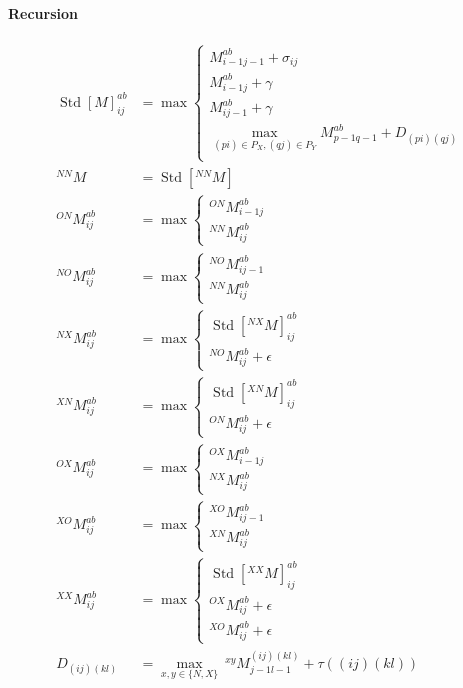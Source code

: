 \documentclass{article}
\newcommand{\N}[1]{\operatorname{Std}[#1]}
\begin{document}
\paragraph{Recursion}
\begin{align*}
  \N{M}^{ab}_{ij} &= 
  \max
  \begin{cases}
    M^{ab}_{i-1j-1} + \sigma_{ij}\\
    M^{ab}_{i-1j} + \gamma\\
    M^{ab}_{ij-1} + \gamma\\
    \max_{(pi)\in P_X,(qj)\in P_Y} M^{ab}_{p-1q-1} + D_{(pi)(qj)}\\
  \end{cases}\\
  ^{NN}M &= \N{^{NN}M}\\
  ^{ON}M^{ab}_{ij} &= \max 
  \begin{cases}
    ^{ON}M^{ab}_{i-1j}\\
    ^{NN}M^{ab}_{ij}
  \end{cases}\\
  ^{NO}M^{ab}_{ij} &= \max 
  \begin{cases}
    ^{NO}M^{ab}_{ij-1}\\
    ^{NN}M^{ab}_{ij}
  \end{cases}\\
  ^{NX}M^{ab}_{ij} &= \max 
  \begin{cases}
    \N{^{NX}M}^{ab}_{ij}\\
    ^{NO}M^{ab}_{ij}+\epsilon
  \end{cases}\\
  ^{XN}M^{ab}_{ij} &= \max 
  \begin{cases}
    \N{^{XN}M}^{ab}_{ij}\\
    ^{ON}M^{ab}_{ij}+\epsilon
  \end{cases}\\
  ^{OX}M^{ab}_{ij} &= \max 
  \begin{cases}
    ^{OX}M^{ab}_{i-1j}\\
    ^{NX}M^{ab}_{ij}
  \end{cases}\\
  ^{XO}M^{ab}_{ij} &= \max 
  \begin{cases}
    ^{XO}M^{ab}_{ij-1}\\
    ^{XN}M^{ab}_{ij}
  \end{cases}\\
  ^{XX}M^{ab}_{ij} &= \max 
  \begin{cases}
    \N{^{XX}M}^{ab}_{ij}\\
    ^{OX}M^{ab}_{ij}+\epsilon\\
    ^{XO}M^{ab}_{ij}+\epsilon
  \end{cases}\\
  D_{(ij)(kl)} &= \max_{x,y\in\{N,X\}}\ ^{xy}M^{(ij)(kl)}_{j-1l-1} + \tau((ij)(kl))
\end{align*}
\end{document}
